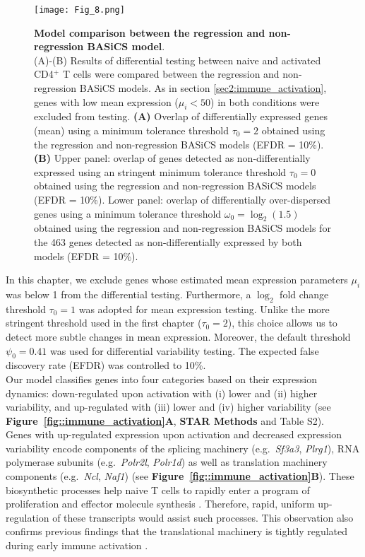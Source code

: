\begin{figure}[!h]
\centering
\texttt{[image: Fig\_8.png]}
\caption{\textbf{Model comparison between the regression and non-regression BASiCS model}.\\
(A)-(B) Results of differential testing between naive and activated CD4$^+$ T cells were compared between the regression and non-regression BASiCS models. As in section \ref{sec2:immune_activation}, genes with low mean expression ($\mu_i<50$) in both conditions were excluded from testing. \textbf{(A)} Overlap of differentially expressed genes (mean) using a minimum tolerance threshold $
\tau_0=2$ obtained using the regression and non-regression BASiCS models (EFDR = 10\%).\textbf{(B)} Upper panel: overlap of genes detected as non-differentially expressed using an stringent minimum tolerance threshold $\tau_0=0$ obtained using the regression and non-regression BASiCS models (EFDR = 10\%). Lower panel: overlap of differentially over-dispersed genes using a minimum tolerance threshold $\omega_0=\log_2(1.5)$ obtained using the regression and non-regression  BASiCS models for the 463 genes detected as non-differentially expressed by both models (EFDR = 10\%).\\}
\label{fig2:model_comparison}
\end{figure}

In this chapter, we exclude genes whose estimated mean expression parameters $\mu_i$ was below 1 from the differential testing. Furthermore, a $\log_2$ fold change threshold $\tau_0 = 1$ was adopted for mean expression testing. Unlike the more stringent threshold used in the first chapter ($\tau_0 = 2$), this choice allows us to detect more subtle changes in mean expression. Moreover, the default threshold $\psi_0 = 0.41$ was used for differential variability testing. The expected false discovery rate (EFDR) was controlled to 10\%.\\

Our model classifies genes into four categories based on their expression dynamics: down-regulated upon activation with (i) lower and (ii) higher variability, and up-regulated with (iii) lower and (iv) higher variability (see \textbf{Figure~\ref{fig::immune_activation}A}, \textbf{STAR Methods} and Table S2). \\

Genes with up-regulated expression upon activation and decreased expression variability encode components of the splicing machinery (e.g.~\textit{Sf3a3}, \textit{Plrg1}), RNA polymerase subunits (e.g.~\textit{Polr2l}, \textit{Polr1d}) as well as translation machinery components (e.g.~\textit{Ncl}, \textit{Naf1}) (see \textbf{Figure~\ref{fig::immune_activation}B}). These biosynthetic processes help naive T cells to rapidly enter a program of proliferation and effector molecule synthesis \citep{Tan2017,Araki2017}. Therefore, rapid, uniform up-regulation of these transcripts would assist such processes. This observation also confirms previous findings that the translational machinery is tightly regulated during early immune activation \citep{Martinez-jimenez2017}.\\ 

